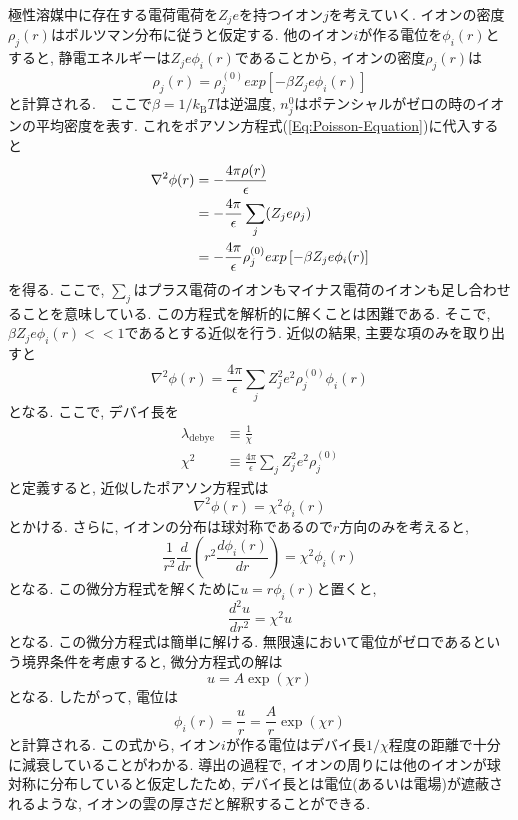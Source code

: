 極性溶媒中に存在する電荷電荷を$Z_{j} e$を持つイオン$j$を考えていく.
イオンの密度$\rho_{j}(r)$はボルツマン分布に従うと仮定する. 
他のイオン$i$が作る電位を$\phi_{i}(r)$とすると, 静電エネルギーは$Z_{j}e \phi_{i}(r)$であることから, イオンの密度$\rho_{j}(r)$は
\begin{equation}
    \rho_{j}(r) =
    \rho_{j}^{(0)} exp\left[-\beta Z_{j}e \phi_{i}(r)\right]
\end{equation}
と計算される.　ここで$\beta = 1/k_{\mathrm{B}}T$は逆温度, $n_{j}^{0}$はポテンシャルがゼロの時のイオンの平均密度を表す. 
これをポアソン方程式(\ref{Eq:Poisson-Equation})に代入すると
\begin{align}
    \nabla^{2} \phi(r)
    &=
    - \frac{4\pi\rho(r)}{\epsilon}
    \notag \\
    &=
    - \frac{4\pi}{\epsilon} \sum_{j}(Z_{j} e \rho_{j})
    \notag \\
    &=
    - \frac{4\pi}{\epsilon}
    \rho_{j}^{(0)} exp\left[-\beta Z_{j}e \phi_{i}(r)\right]
\end{align}
を得る. ここで, $\sum_{j}$はプラス電荷のイオンもマイナス電荷のイオンも足し合わせることを意味している. この方程式を解析的に解くことは困難である. そこで, $\beta Z_{j} e \phi_{i}(r) << 1$であるとする近似を行う. 近似の結果, 主要な項のみを取り出すと
\begin{equation}
    \nabla^{2} \phi(r)
    =
    \frac{4\pi}{\epsilon}
    \sum_{j} Z_{j}^{2} e^{2} \rho_{j}^{(0)} \phi_{i}(r)
\end{equation}
となる. ここで, デバイ長を
\begin{align}
    \lambda_{\mathrm{debye}} &\equiv \frac{1}{\chi} 
    \\
    \chi^{2} &\equiv 
    \frac{4\pi}{\epsilon}
    \sum_{j} Z_{j}^{2} e^{2} \rho_{j}^{(0)}
\end{align}
と定義すると, 近似したポアソン方程式は
\begin{equation}
    \nabla^{2} \phi(r) = \chi^{2} \phi_{i}(r)
\end{equation}
とかける. さらに, イオンの分布は球対称であるので$r$方向のみを考えると,
\begin{equation}
    \frac{1}{r^{2}} \frac{d}{dr}
    \left(
        r^{2}
        \frac{d\phi_{i}(r)}{dr}
    \right)
    =
    \chi^{2} \phi_{i}(r)
\end{equation}
となる. この微分方程式を解くために$u = r \phi_{i}(r)$と置くと,
\begin{equation}
    \frac{d^{2} u}{dr^{2}} = \chi^{2} u
\end{equation}
となる. この微分方程式は簡単に解ける.
無限遠において電位がゼロであるという境界条件を考慮すると, 微分方程式の解は
\begin{equation}
    u = A \exp(\chi r)
\end{equation}
となる. したがって, 電位は
\begin{equation}
    \phi_{i}(r) = \frac{u}{r} = \frac{A}{r} \exp(\chi r)
\end{equation}
と計算される. この式から, イオン$i$が作る電位はデバイ長$1/\chi$程度の距離で十分に減衰していることがわかる. 導出の過程で, イオンの周りには他のイオンが球対称に分布していると仮定したため, デバイ長とは電位(あるいは電場)が遮蔽されるような, イオンの雲の厚さだと解釈することができる.


